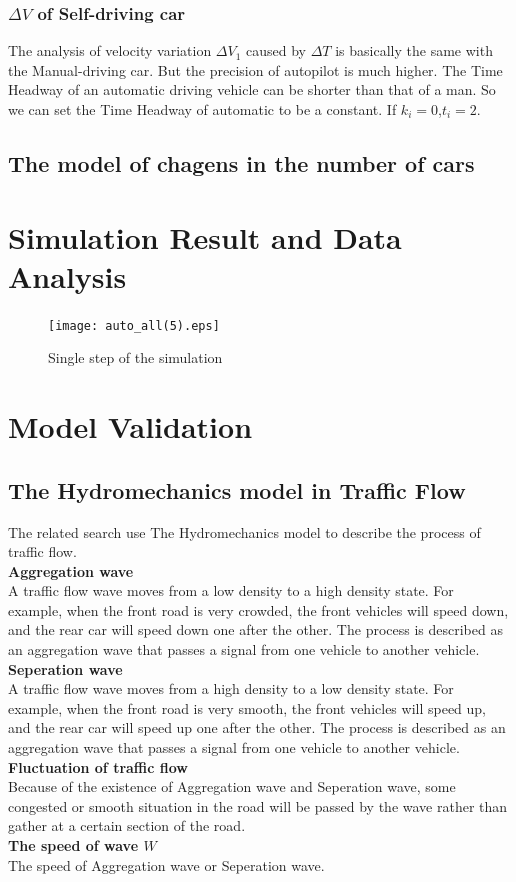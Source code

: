 \documentclass{mcmthesis}
\begin{document}
\subsubsection{$\Delta V$ of Self-driving car}
The analysis of velocity variation $\Delta V_{1}$ caused by $\Delta T$ is basically the same with the Manual-driving car. But the precision of autopilot is much higher. The Time Headway of an automatic driving vehicle can be shorter than that of a man. So we can set the Time Headway of automatic to be a constant. If $k_i=0$,$t_i=2$.


\subsection{The model of chagens in the number of cars}
\label{changes of cars}
 
\section{Simulation Result and Data Analysis}
\begin{figure}[H]
	\centerline{\texttt{[image: auto\_all(5).eps]}}
	\caption{Single step of the simulation}
\end{figure}
\section{Model Validation}
\subsection{The Hydromechanics model in Traffic Flow}
	The related search use The Hydromechanics model to describe the process of traffic flow.\\
\indent\textbf{Aggregation wave}\\
\indent	A traffic flow wave moves from a low density to a high density state. For example, when the front road is very crowded, the front vehicles will speed down, and the rear car will speed down one after the other. The process is described as an aggregation wave that passes a signal from one vehicle to another vehicle.\\
\indent \textbf{Seperation wave}\\
\indent	A traffic flow wave moves from a high density to a low density state. For example, when the front road is very smooth, the front vehicles will speed up, and the rear car will speed up one after the other. The process is described as an aggregation wave that passes a signal from one vehicle to another vehicle.\\
\indent \textbf{Fluctuation of traffic flow}\\
\indent		Because of the existence of Aggregation wave and Seperation wave, some congested or smooth situation in the road will be passed by the wave rather than gather at a certain section of the road.\\
\indent \textbf{The speed of wave $W$}\\
\indent	The speed of Aggregation wave or Seperation wave.\\
\end{document}
